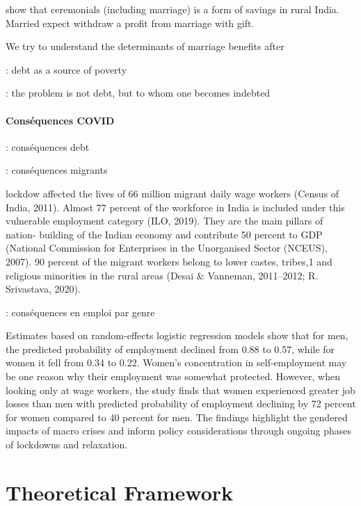 \documentclass[a4paper, 11pt, onecolumn]{article}
\begin{document}
\cite{Guerin2020c} show that ceremonials (including marriage) is a form of savings in rural India.
Married expect withdraw a profit from marriage with gift.


We try to understand the determinants of marriage benefits after 


\cite{Krishna2003, Krishna2004} : debt as a source of poverty 




\cite{Guerin2014a} : the problem is not debt, but to whom one becomes indebted


\paragraph{Conséquences COVID}

\cite{Guerin2020} : conséquences debt

\cite{Shahare2021} : conséquences migrants 

lockdow affected the lives of 66 million migrant daily wage workers
(Census of India, 2011). Almost 77 percent of the workforce in India is included under
this vulnerable employment category (ILO, 2019). They are the main pillars of nation-
building of the Indian economy and contribute 50 percent to GDP (National
Commission for Enterprises in the Unorganised Sector (NCEUS), 2007). 
90 percent of the migrant workers belong to lower castes,
tribes,1 and religious minorities in the rural areas (Desai \& Vanneman, 2011–2012;
R. Srivastava, 2020).


\cite{Desai2021} : conséquences en emploi par genre

Estimates based on random-effects
logistic regression models show that for men, the predicted probability of
employment declined from 0.88 to 0.57, while for women it fell from 0.34 to
0.22. Women’s concentration in self-employment may be one reason why their
employment was somewhat protected. However, when looking only at wage
workers, the study finds that women experienced greater job losses than men
with predicted probability of employment declining by 72 percent for women
compared to 40 percent for men. The findings highlight the gendered impacts
of macro crises and inform policy considerations through ongoing phases of
lockdowns and relaxation.

\section{Theoretical Framework}
\end{document}
